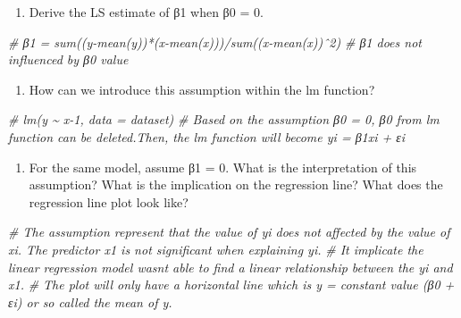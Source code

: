 \documentclass[
]{article}
\newenvironment{Shaded}{\begin{snugshade}}{\end{snugshade}}
\newcommand{\CommentTok}[1]{\textcolor[rgb]{0.56,0.35,0.01}{\textit{#1}}}
\providecommand{\tightlist}{%
  \setlength{\itemsep}{0pt}\setlength{\parskip}{0pt}}
\begin{document}
\begin{enumerate}
\def\labelenumi{(\alph{enumi})}
\setcounter{enumi}{1}
\tightlist
\item
  Derive the LS estimate of β1 when β0 = 0.
\end{enumerate}

\begin{Shaded}
\begin{Highlighting}[]
\CommentTok{\# β1 = sum((y{-}mean(y))*(x{-}mean(x)))/sum((x{-}mean(x))ˆ2)}
\CommentTok{\# β1 does not influenced by β0 value}
\end{Highlighting}
\end{Shaded}

\begin{enumerate}
\def\labelenumi{(\alph{enumi})}
\setcounter{enumi}{2}
\tightlist
\item
  How can we introduce this assumption within the lm function?
\end{enumerate}

\begin{Shaded}
\begin{Highlighting}[]
\CommentTok{\# lm(y \textasciitilde{} x{-}1, data = dataset)}
\CommentTok{\# Based on the assumption β0 = 0, β0 from lm function can be deleted.Then, the lm function will become yi = β1xi + εi }
\end{Highlighting}
\end{Shaded}

\begin{enumerate}
\def\labelenumi{(\alph{enumi})}
\setcounter{enumi}{3}
\tightlist
\item
  For the same model, assume β1 = 0. What is the interpretation of this
  assumption? What is the implication on the regression line? What does
  the regression line plot look like?
\end{enumerate}

\begin{Shaded}
\begin{Highlighting}[]
\CommentTok{\# The assumption represent that the value of yi does not affected by the value of xi. The predictor x1 is not significant when explaining yi.}
\CommentTok{\# It implicate the linear regression model wasn\textquotesingle{}t able to find a linear relationship between the yi and x1.}
\CommentTok{\# The plot will only have a horizontal line which is y = constant value (β0 + εi) or so called the mean of y.}
\end{Highlighting}
\end{Shaded}
\end{document}
